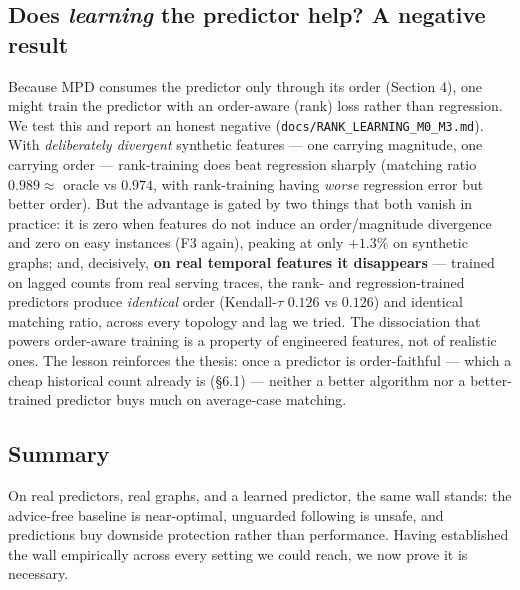 \subsection{\texorpdfstring{Does \emph{learning} the predictor help? A
negative
result}{Does learning the predictor help? A negative result}}

Because MPD consumes the predictor only through its order (Section 4),
one might train the predictor with an order-aware (rank) loss rather
than regression. We test this and report an honest negative
(\texttt{docs/RANK\_LEARNING\_M0\_M3.md}). With \emph{deliberately
divergent} synthetic features --- one carrying magnitude, one carrying
order --- rank-training does beat regression sharply (matching ratio
\(0.989\approx\) oracle vs \(0.974\), with rank-training having
\emph{worse} regression error but better order). But the advantage is
gated by two things that both vanish in practice: it is zero when
features do not induce an order/magnitude divergence and zero on easy
instances (F3 again), peaking at only \(+1.3\%\) on synthetic graphs;
and, decisively, \textbf{on real temporal features it disappears} ---
trained on lagged counts from real serving traces, the rank- and
regression-trained predictors produce \emph{identical} order
(Kendall-\(\tau\) \(0.126\) vs \(0.126\)) and identical matching ratio,
across every topology and lag we tried. The dissociation that powers
order-aware training is a property of engineered features, not of
realistic ones. The lesson reinforces the thesis: once a predictor is
order-faithful --- which a cheap historical count already is (§6.1) ---
neither a better algorithm nor a better-trained predictor buys much on
average-case matching.

\subsection{Summary}

On real predictors, real graphs, and a learned predictor, the same wall
stands: the advice-free baseline is near-optimal, unguarded following is
unsafe, and predictions buy downside protection rather than performance.
Having established the wall empirically across every setting we could
reach, we now prove it is necessary.
